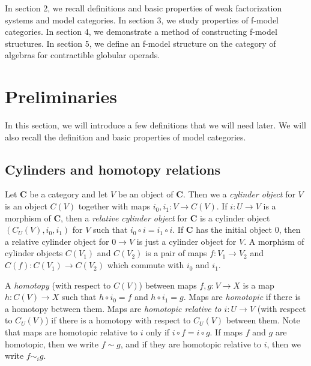 \documentclass{amsart}
\theoremstyle{definition}
\newcommand{\cat}[1]{\mathbf{#1}}
\newcommand{\C}{\cat{C}}
\newcommand{\cyli}{i}
\begin{document}
In section 2, we recall definitions and basic properties of weak factorization systems and model categories.
In section 3, we study properties of f-model categories.
In section 4, we demonstrate a method of constructing f-model structures.
In section 5, we define an f-model structure on the category of algebras for contractible globular operads.

\section{Preliminaries}

In this section, we will introduce a few definitions that we will need later.
We will also recall the definition and basic properties of model categories.

\subsection{Cylinders and homotopy relations}

Let $\C$ be a category and let $V$ be an object of $\C$.
Then we a \emph{cylinder object} for $V$ is an object $C(V)$ together with maps $\cyli_0,\cyli_1 : V \to C(V)$.
If $i : U \to V$ is a morphism of $\C$, then a \emph{relative cylinder object} for $\C$
is a cylinder object $(C_U(V),\cyli_0,\cyli_1)$ for $V$ such that $\cyli_0 \circ i = \cyli_1 \circ i$.
If $\C$ has the initial object $0$, then a relative cylinder object for $0 \to V$ is just a cylinder object for $V$.
A morphism of cylinder objects $C(V_1)$ and $C(V_2)$ is a pair of maps $f : V_1 \to V_2$ and $C(f) : C(V_1) \to C(V_2)$ which commute with $\cyli_0$ and $\cyli_1$.

A \emph{homotopy} (with respect to $C(V)$) between maps $f,g : V \to X$ is a map $h : C(V) \to X$ such that $h \circ \cyli_0 = f$ and $h \circ \cyli_1 = g$.
Maps are \emph{homotopic} if there is a homotopy between them.
Maps are \emph{homotopic relative to $i : U \to V$} (with respect to $C_U(V)$) if there is a homotopy with respect to $C_U(V)$ between them.
Note that maps are homotopic relative to $i$ only if $i \circ f = i \circ g$.
If maps $f$ and $g$ are homotopic, then we write $f \sim g$, and if they are homotopic relative to $i$, then we write $f \sim_i g$.
\end{document}

